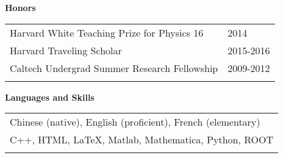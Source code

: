 \documentclass[letterpaper,11pt,oneside]{article}
\begin{document}
\vspace{-0.25cm}
\raggedright
 \textbf{\Large{Honors}} \\
\vspace{-0.5cm}
 \normalsize
\begin{flushleft}
\hspace{1cm}
\begin{tabular}{@{} l l }
 Harvard White Teaching Prize for Physics 16 & 2014\\
 Harvard Traveling Scholar & 2015-2016\\
 Caltech Undergrad Summer Research Fellowship & 2009-2012\\
    \hspace{0.8\linewidth} & \hspace{0.1\linewidth} \\
 \end{tabular}
\end{flushleft}

 \raggedright
 \textbf{\Large{Languages and Skills}} \\
 \normalsize
 \begin{flushleft}
 \begin{tabular}{@{} l}
     Chinese (native), English (proficient), French (elementary)\\
     C++, HTML, \LaTeX, Matlab, Mathematica, Python, ROOT \\
     \\
      \end{tabular}
\end{flushleft}
\end{document}

